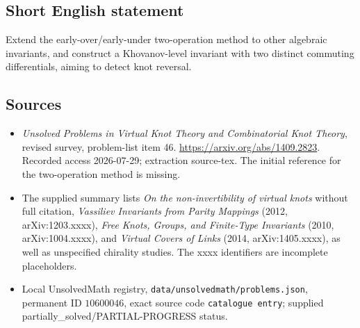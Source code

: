 \documentclass[11pt]{article}
\begin{document}
\subsection{Short English statement}
Extend the early-over/early-under two-operation method to other algebraic invariants, and construct a Khovanov-level invariant with two distinct commuting differentials, aiming to detect knot reversal.
\subsection{Sources}
\begin{itemize}
\item \emph{Unsolved Problems in Virtual Knot Theory and Combinatorial Knot Theory}, revised survey, problem-list item 46. \url{https://arxiv.org/abs/1409.2823}. Recorded access 2026-07-29; extraction source-tex. The initial reference for the two-operation method is missing.
\item The supplied summary lists \emph{On the non-invertibility of virtual knots} without full citation, \emph{Vassiliev Invariants from Parity Mappings} (2012, arXiv:1203.xxxx), \emph{Free Knots, Groups, and Finite-Type Invariants} (2010, arXiv:1004.xxxx), and \emph{Virtual Covers of Links} (2014, arXiv:1405.xxxx), as well as unspecified chirality studies. The xxxx identifiers are incomplete placeholders.
\item Local UnsolvedMath registry, \texttt{data/unsolvedmath/problems.json}, permanent ID \(10600046\), exact source code \texttt{catalogue entry}; supplied partially\_solved/PARTIAL-PROGRESS status.
\end{itemize}
\end{document}
